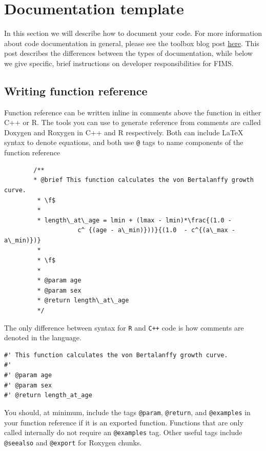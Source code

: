 \documentclass[
]{book}
\begin{document}
\hypertarget{documentation-template}{%
\chapter{Documentation template}\label{documentation-template}}

In this section we will describe how to document your code. For more information about code documentation in general, please see the
toolbox blog post \href{https://noaa-fisheries-integrated-toolbox.github.io/resources/best-practices/code-documentation/}{here}. This post describes the differences between the types of documentation,
while below we give specific, brief instructions on developer responsibilities for FIMS.

\hypertarget{writing-function-reference}{%
\section{Writing function reference}\label{writing-function-reference}}

Function reference can be written inline in comments above the function in either C++ or R. The tools
you can use to generate reference from comments are called Doxygen and Roxygen in C++ and R respectively.
Both can include LaTeX syntax to denote equations, and both use \texttt{@} tags to name components of the function reference

\begin{verbatim}
        /**
        * @brief This function calculates the von Bertalanffy growth curve.
         * \f$
         * 
         * length\_at\_age = lmin + (lmax - lmin)*\frac{(1.0 -
                    c^ {(age - a\_min)}))}{(1.0  - c^{(a\_max - a\_min)})}
         * 
         * \f$
         * 
         * @param age
         * @param sex
         * @return length\_at\_age 
         */
\end{verbatim}

The only difference between syntax for \texttt{R} and \texttt{C++} code is how comments are denoted in the language.

\begin{verbatim}
#' This function calculates the von Bertalanffy growth curve.
#'
#' @param age
#' @param sex
#' @return length_at_age
\end{verbatim}

You should, at minimum, include the tags \texttt{@param}, \texttt{@return}, and \texttt{@examples} in your function reference if it is an exported function.
Functions that are only called internally do not require an \texttt{@examples} tag. Other useful tags include \texttt{@seealso} and \texttt{@export} for Roxygen chunks.
\end{document}
